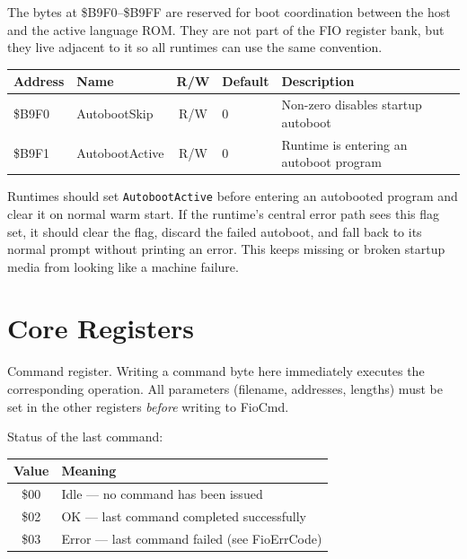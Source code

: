 The bytes at \$B9F0--\$B9FF are reserved for boot coordination between the
host and the active language ROM. They are not part of the FIO register bank,
but they live adjacent to it so all runtimes can use the same convention.

\begin{center}
\small
\begin{tabular}{@{}llcll@{}}
\toprule
\textbf{Address} & \textbf{Name} & \textbf{R/W} & \textbf{Default} & \textbf{Description} \\
\midrule
\$B9F0 & AutobootSkip   & R/W & 0 & Non-zero disables startup autoboot \\
\$B9F1 & AutobootActive & R/W & 0 & Runtime is entering an autoboot program \\
\bottomrule
\end{tabular}
\end{center}

Runtimes should set \texttt{AutobootActive} before entering an autobooted
program and clear it on normal warm start. If the runtime's central error path
sees this flag set, it should clear the flag, discard the failed autoboot, and
fall back to its normal prompt without printing an error. This keeps missing or
broken startup media from looking like a machine failure.


\section{Core Registers}
\label{sec:fio-core}



Command register.  Writing a command byte here immediately executes the
corresponding operation.  All parameters (filename, addresses, lengths) must be
set in the other registers \emph{before} writing to FioCmd.



Status of the last command:

\begin{center}
\small
\begin{tabular}{@{}cl@{}}
\toprule
\textbf{Value} & \textbf{Meaning} \\
\midrule
\$00 & Idle --- no command has been issued \\
\$02 & OK --- last command completed successfully \\
\$03 & Error --- last command failed (see FioErrCode) \\
\bottomrule
\end{tabular}
\end{center}


